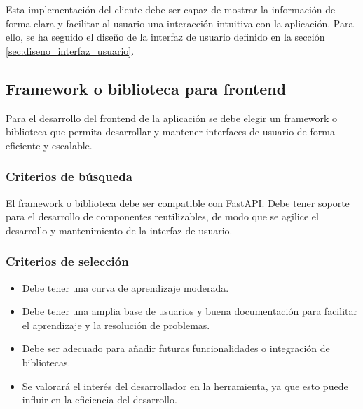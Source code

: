Esta implementación del cliente debe ser capaz de mostrar la información de forma clara y facilitar al usuario una interacción intuitiva con la aplicación. Para ello, se ha seguido el diseño de la interfaz de usuario definido en la sección \ref{sec:diseno_interfaz_usuario}.


\subsection{Framework o biblioteca para frontend}
Para el desarrollo del frontend de la aplicación se debe elegir un framework o biblioteca que permita desarrollar y mantener interfaces de usuario de forma eficiente y escalable. 

\subsubsection{Criterios de búsqueda}
El framework o biblioteca debe ser compatible con FastAPI. Debe tener soporte para el desarrollo de componentes reutilizables, de modo que se agilice el desarrollo y mantenimiento de la interfaz de usuario. 

\subsubsection{Criterios de selección}
\begin{itemize}
    \item Debe tener una curva de aprendizaje moderada.
    \item Debe tener una amplia base de usuarios y buena documentación para facilitar el aprendizaje y la resolución de problemas.
    \item Debe ser adecuado para añadir futuras funcionalidades o integración de bibliotecas.
    \item Se valorará el interés del desarrollador en la herramienta, ya que esto puede influir en la eficiencia del desarrollo.
\end{itemize}

